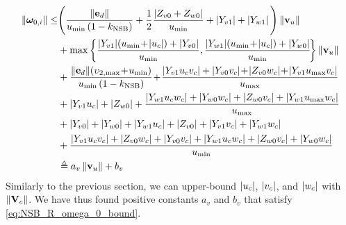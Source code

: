 \begin{equation}
\begin{split}
    \norm{\bs{\omega}_{0, i}} \leq &
    \Bigg(\frac{\norm{\mat{e}_d}}{u_{\min}\left(1 - k_{\rm NSB}\right)}
    + \frac{1}{2}\frac{\abs{Z_{v0} + Z_{w0}}}{u_{\min}} + \abs{Y_{v1}} + \abs{Y_{w1}}\Bigg) \norm{\mat{v}_u} \\
    &+ \max\left\{\frac{\abs{Y_{v1}}\!\left(u_{\min}\!+\!\abs{u_c}\right) + \abs{Y_{v0}}}{u_{\min}}, \frac{\abs{Y_{w1}}\!\left(u_{\min}\!+\!\abs{u_c}\right) + \abs{Y_{w0}}}{u_{\min}}\!\right\} \norm{\mat{v}_u} \\
    &+ \frac{\norm{\mat{e}_d}\!\left(\upsilon_{2, \max}\! + \!u_{\min}\right)}{u_{\min}\left(1 - k_{\rm NSB}\right)}
    \!+\! \frac{\abs{Y_{v1}u_cv_c} + \abs{Y_{v0}v_c}\! + \!\abs{Z_{v0}w_c}\! + \!\abs{Y_{v1}u_{\max}v_c}}{u_{\max}} \\
    & + \abs{Y_{v1}u_c} + \abs{Z_{w0}} + \frac{\abs{Y_{w1}u_cw_c} + \abs{Y_{w0}w_c} + \abs{Z_{w0}v_c} + \abs{Y_{w1}u_{\max}w_c}}{u_{\max}} \\
    & + \abs{Y_{v0}} + \abs{Y_{w0}} + \abs{Y_{w1}u_c} + \abs{Z_{v0}} + \abs{Y_{v1}v_c} + \abs{Y_{w1}w_c} \\
    & + \frac{\abs{Y_{v1}u_cv_c} + \abs{Z_{v0}w_c} + \abs{Y_{v0}v_c} + \abs{Y_{w1}u_cw_c} + \abs{Z_{w0}v_c} + \abs{Y_{w0}w_c}}{u_{\min}} \\
    & \triangleq a_v\norm{\mat{v}_u} + b_v
\end{split}
\end{equation}
Similarly to the previous section, we can upper-bound $\left|u_c\right|$, $\left|v_c\right|$, and $\left|w_c\right|$ with $\left\|\mathbf{V}_c\right\|$.
We have thus found positive constants $a_v$ and $b_v$ that satisfy \eqref{eq:NSB_R_omega_0_bound}.
